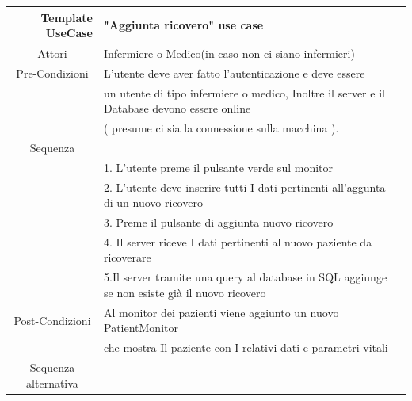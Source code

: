 \documentclass{article}
\begin{document}
\vspace{1cm}

\begin{center}

	\begin{tabular}{r@{\vspace{0.4cm}}ll}
	

	\hline
	
	\textbf{Template UseCase  } &  \textbf{       "Aggiunta ricovero" use case } \\

	\hline
	
	\multicolumn{1}{c}{Attori}  & Infermiere o Medico(in caso non ci siano infermieri) \\

	\cline{1-1}
\hline

	\multicolumn{1}{c}{Pre-Condizioni}  & L’utente deve aver fatto l’autenticazione e deve essere\\ \cline{1-1}&

un utente di tipo infermiere o medico, Inoltre il server e il Database devono essere online\\&
( presume ci sia la connessione sulla macchina ).\\

\hline
	\multicolumn{1}{c}{Sequenza}    \\ \cline{1-1}&
    1. L’utente preme il pulsante verde sul monitor \\&
    2. L’utente deve inserire tutti I dati pertinenti all’aggunta di un nuovo ricovero \\&
    3. Preme il pulsante di aggiunta nuovo ricovero\\&
    4. Il server riceve I dati pertinenti al nuovo paziente da ricoverare  \\&
    5.Il server tramite una query al database in SQL aggiunge se non esiste già il nuovo ricovero  \\

\hline
	
\multicolumn{1}{c}{Post-Condizioni}  &Al monitor dei pazienti viene aggiunto un nuovo PatientMonitor \\ \cline{1-1}&

che mostra Il paziente con I relativi dati e parametri vitali\\
\hline

\multicolumn{1}{c}{Sequenza alternativa}  \\     


\hline

	\end{tabular}

\end{center}
\end{document}
